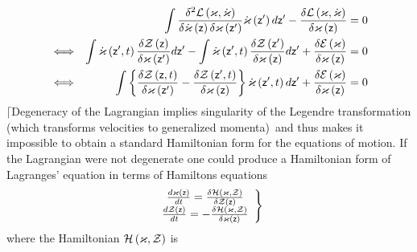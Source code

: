 \begin{eqnarray}
&&\int \frac{\delta ^{2}{\cal L}\left( {\cal \varkappa },{\cal \dot{\varkappa%
}}\right) }{\delta {\cal \dot{\varkappa}}\left( {\sf z}\right) \delta {\cal %
\varkappa }\left( {\sf z}^{\prime }\right) }{\cal \dot{\varkappa}}\left( 
{\sf z}^{\prime }\right) d{\sf z}^{\prime }-\frac{\delta {\cal L}\left( 
{\cal \varkappa },{\cal \dot{\varkappa}}\right) }{\delta {\cal \varkappa }%
\left( {\sf z}\right) }=0  \nonumber \\
&\Longleftrightarrow &\int {\cal \dot{\varkappa}}\left( {\sf z}^{\prime
},t\right) \frac{\delta {\cal Z}\left( {\sf z}\right) }{\delta {\cal %
\varkappa }\left( {\sf z}^{\prime }\right) }d{\sf z}^{\prime }-\int {\cal 
\dot{\varkappa}}\left( {\sf z}^{\prime },t\right) \frac{\delta {\cal Z}%
\left( {\sf z}^{\prime }\right) }{\delta {\cal \varkappa }\left( {\sf z}%
\right) }d{\sf z}^{\prime }+\frac{\delta {\cal E}\left( {\cal \varkappa }%
\right) }{\delta {\cal \varkappa }\left( {\sf z}\right) }=0  \nonumber \\
&\Longleftrightarrow &\int \left\{ \frac{\delta {\cal Z}\left( {\sf z}%
,t\right) }{\delta {\cal \varkappa }\left( {\sf z}^{\prime }\right) }-\frac{%
\delta {\cal Z}\left( {\sf z}^{\prime },t\right) }{\delta {\cal \varkappa }%
\left( {\sf z}\right) }\right\} {\cal \dot{\varkappa}}\left( {\sf z}^{\prime
},t\right) d{\sf z}^{\prime }+\frac{\delta {\cal E}\left( {\cal \varkappa }%
\right) }{\delta {\cal \varkappa }\left( {\sf z}\right) }=0
\end{eqnarray}%
$\lceil $Degeneracy of the Lagrangian implies singularity of the Legendre
transformation (which transforms velocities to generalized momenta)\ and
thus makes it impossible to obtain a standard Hamiltonian form for the
equations of motion. If the Lagrangian were not degenerate one could produce
a Hamiltonian form of Lagranges' equation in terms of Hamiltons equations 
\begin{equation}
\left. 
\begin{array}{c}
\frac{d{\cal \varkappa }\left( {\sf z}\right) }{dt}=\frac{\delta {\cal H}%
\left( {\cal \varkappa },{\cal Z}\right) }{\delta {\cal Z}\left( {\sf z}%
\right) } \\ 
\frac{d{\cal Z}\left( {\sf z}\right) }{dt}=-\frac{\delta {\cal H}\left( 
{\cal \varkappa },{\cal Z}\right) }{\delta {\cal \varkappa }\left( {\sf z}%
\right) }%
\end{array}%
\right\}   \label{HE}
\end{equation}%
where the Hamiltonian ${\cal H}\left( {\cal \varkappa },{\cal Z}\right) $ is
